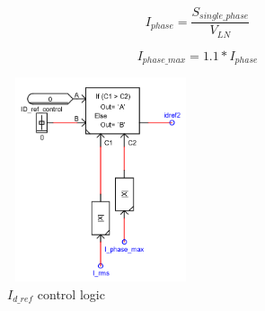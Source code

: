 \begin{equation}
    I_{phase} = \frac{S_{single\_phase}}{V_{LN}}
\end{equation}

\begin{equation}\label{i_phase_max_eq}
    I_{phase\_max} = 1.1 * I_{phase}
\end{equation}

\begin{figure}[H]
\centering
    \includegraphics[height = 6cm,width = 5.5cm]{Diagrams/Chapter_4/Idref_control.PNG}
    \caption{$I_{d\_ref}$ control logic}
    \label{fig:Idref_control}
\end{figure}
